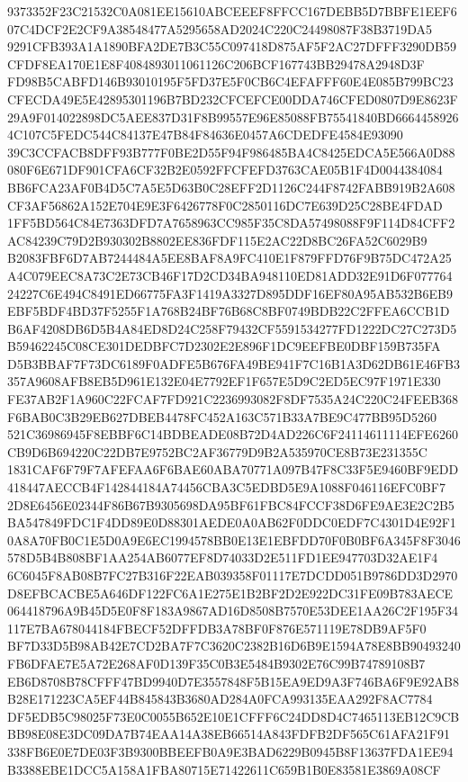 \documentclass[UTF8,fontset=fandol,zihao=-4,a4paper]{ctexart}
\begin{document}
{{9373352F23C21532C0A081EE15610ABCEEEF8FFCC167DEBB5D7BBFE1EEF607C4DCF2E2CF9A38548477A5295658AD2024C220C24498087F38B3719DA5
9291CFB393A1A1890BFA2DE7B3C55C097418D875AF5F2AC27DFFF3290DB59CFDF8EA170E1E8F4084893011061126C206BCF167743BB29478A2948D3F
FD98B5CABFD146B93010195F5FD37E5F0CB6C4EFAFFF60E4E085B799BC23CFECDA49E5E42895301196B7BD232CFCEFCE00DDA746CFED0807D9E8623F
29A9F014022898DC5AEE837D31F8B99557E96E85088FB75541840BD66644589264C107C5FEDC544C84137E47B84F84636E0457A6CDEDFE4584E93090
39C3CCFACB8DFF93B777F0BE2D55F94F986485BA4C8425EDCA5E566A0D88080F6E671DF901CFA6CF32B2E0592FFCFEFD3763CAE05B1F4D0044384084
BB6FCA23AF0B4D5C7A5E5D63B0C28EFF2D1126C244F8742FABB919B2A608CF3AF56862A152E704E9E3F6426778F0C2850116DC7E639D25C28BE4FDAD
1FF5BD564C84E7363DFD7A7658963CC985F35C8DA57498088F9F114D84CFF2AC84239C79D2B930302B8802EE836FDF115E2AC22D8BC26FA52C6029B9
B2083FBF6D7AB7244484A5EE8BAF8A9FC410E1F879FFD76F9B75DC472A25A4C079EEC8A73C2E73CB46F17D2CD34BA948110ED81ADD32E91D6F077764
24227C6E494C8491ED66775FA3F1419A3327D895DDF16EF80A95AB532B6EB9EBF5BDF4BD37F5255F1A768B24BF76B68C8BF0749BDB22C2FFEA6CCB1D
B6AF4208DB6D5B4A84ED8D24C258F79432CF5591534277FD1222DC27C273D5B59462245C08CE301DEDBFC7D2302E2E896F1DC9EEFBE0DBF159B735FA
D5B3BBAF7F73DC6189F0ADFE5B676FA49BE941F7C16B1A3D62DB61E46FB3357A9608AFB8EB5D961E132E04E7792EF1F657E5D9C2ED5EC97F1971E330
FE37AB2F1A960C22FCAF7FD921C2236993082F8DF7535A24C220C24FEEB368F6BAB0C3B29EB627DBEB4478FC452A163C571B33A7BE9C477BB95D5260
521C36986945F8EBBF6C14BDBEADE08B72D4AD226C6F24114611114EFE6260CB9D6B694220C22DB7E9752BC2AF36779D9B2A535970CE8B73E231355C
1831CAF6F79F7AFEFAA6F6BAE60ABA70771A097B47F8C33F5E9460BF9EDD418447AECCB4F142844184A74456CBA3C5EDBD5E9A1088F046116EFC0BF7
2D8E6456E02344F86B67B9305698DA95BF61FBC84FCCF38D6FE9AE3E2C2B5BA547849FDC1F4DD89E0D88301AEDE0A0AB62F0DDC0EDF7C4301D4E92F1
0A8A70FB0C1E5D0A9E6EC1994578BB0E13E1EBFDD70F0B0BF6A345F8F3046578D5B4B808BF1AA254AB6077EF8D74033D2E511FD1EE947703D32AE1F4
6C6045F8AB08B7FC27B316F22EAB039358F01117E7DCDD051B9786DD3D2970D8EFBCACBE5A646DF122FC6A1E275E1B2BF2D2E922DC31FE09B783AECE
064418796A9B45D5E0F8F183A9867AD16D8508B7570E53DEE1AA26C2F195F34117E7BA678044184FBECF52DFFDB3A78BF0F876E571119E78DB9AF5F0
BF7D33D5B98AB42E7CD2BA7F7C3620C2382B16D6B9E1594A78E8BB90493240FB6DFAE7E5A72E268AF0D139F35C0B3E5484B9302E76C99B74789108B7
EB6D8708B78CFFF47BD9940D7E3557848F5B15EA9ED9A3F746BA6F9E92AB8B28E171223CA5EF44B845843B3680AD284A0FCA993135EAA292F8AC7784
DF5EDB5C98025F73E0C0055B652E10E1CFFF6C24DD8D4C7465113EB12C9CBBB98E08E3DC09DA7B74EAA14A38EB66514A843FDFB2DF565C61AFA21F91
338FB6E0E7DE03F3B9300BBEEFB0A9E3BAD6229B0945B8F13637FDA1EE94B3388EBE1DCC5A158A1FBA80715E71422611C659B1B0E83581E3869A08CF
}}
\end{document}

